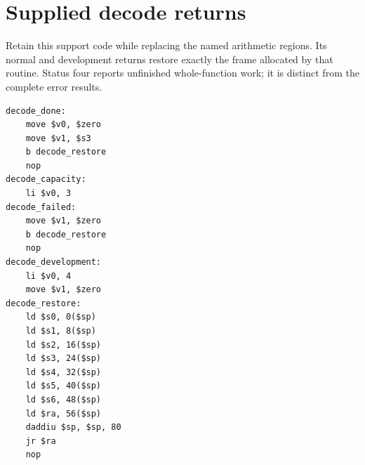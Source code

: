 \section{Supplied decode returns}
Retain this support code while replacing the named arithmetic regions. Its normal and development returns restore exactly the frame allocated by that routine. Status four reports unfinished whole-function work; it is distinct from the complete error results.

\begin{verbatim}
decode_done:
    move $v0, $zero
    move $v1, $s3
    b decode_restore
    nop
decode_capacity:
    li $v0, 3
decode_failed:
    move $v1, $zero
    b decode_restore
    nop
decode_development:
    li $v0, 4
    move $v1, $zero
decode_restore:
    ld $s0, 0($sp)
    ld $s1, 8($sp)
    ld $s2, 16($sp)
    ld $s3, 24($sp)
    ld $s4, 32($sp)
    ld $s5, 40($sp)
    ld $s6, 48($sp)
    ld $ra, 56($sp)
    daddiu $sp, $sp, 80
    jr $ra
    nop
\end{verbatim}

